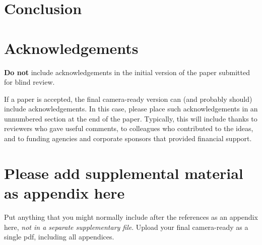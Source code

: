 \documentclass{article}
\begin{document}
\section{Conclusion}

\section*{Acknowledgements}

\textbf{Do not} include acknowledgements in the initial version of
the paper submitted for blind review.

If a paper is accepted, the final camera-ready version can (and
probably should) include acknowledgements. In this case, please
place such acknowledgements in an unnumbered section at the
end of the paper. Typically, this will include thanks to reviewers
who gave useful comments, to colleagues who contributed to the ideas,
and to funding agencies and corporate sponsors that provided financial
support.


\nocite{langley00}





\appendix
\section{Please add supplemental material as appendix here}
%
Put anything that you might normally include after the references as an appendix here, {\it not in a separate supplementary file}. Upload your final camera-ready as a single pdf, including all appendices.

\end{document}
